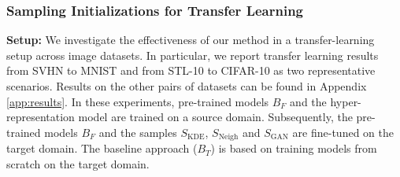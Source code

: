 \documentclass{article}
\begin{document}
\subsubsection{Sampling Initializations for Transfer Learning}
\label{sec:cross_dataset}
%
\textbf{Setup:}
We investigate the effectiveness of our method in a transfer-learning setup across image datasets. In particular, we report transfer learning results from SVHN to MNIST and from STL-10 to CIFAR-10 as two representative scenarios. Results on the other pairs of datasets can be found in Appendix \ref{app:results}. 
In these experiments, pre-trained models $B_F$ and the hyper-representation model are trained on a source domain. Subsequently, the pre-trained models $B_F$ and the samples $S_{\text{KDE}}$, $S_{\text{Neigh}}$ and $S_{\text{GAN}}$ are fine-tuned on the target domain. The baseline approach ($B_T$) is based on training models from scratch on the target domain. 
\end{document}
